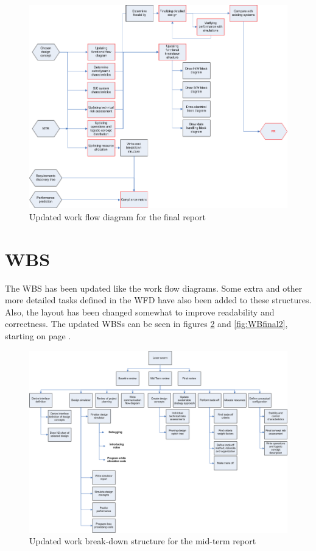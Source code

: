 \begin{figure}
\centering
\includegraphics[width=\textheight, angle=90]{chapters/img/Workflow_diagram_FR_v2.png}
\caption{Updated work flow diagram for the final report}
\label{fig:WFfinal2}
\end{figure}


\section{\acl{WBS}}
\label{WBS}
The \ac{WBS} has been updated like the work flow diagrams. Some extra and other more detailed tasks
defined in the \ac{WFD} have also been added to these structures. Also, the layout has been changed somewhat to improve readability and correctness. The updated \ac{WBS}s can be seen in figures \ref{fig:WBmidterm2} and \ref{fig:WBfinal2}, starting on page \pageref{fig:WBmidterm2}.

\begin{figure}
\centering
\includegraphics[width=\textheight, angle=90]{chapters/img/Workbreakdown_structure_MTR_v2.png}
\caption{Updated work break-down structure for the mid-term report}
\label{fig:WBmidterm2}
\end{figure}

